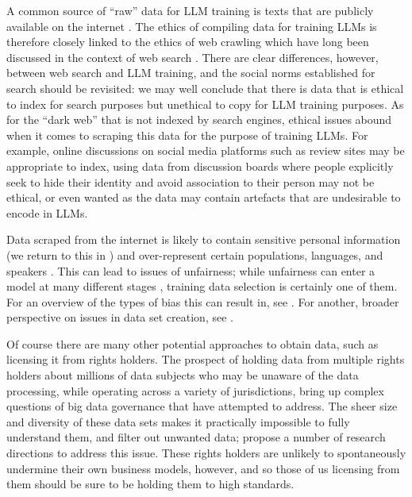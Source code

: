 A common source of ``raw'' data for LLM training is texts that are publicly available on the internet \citep[see e.g.][]{openai2024}. 
The ethics of compiling data for training LLMs is therefore closely linked to the ethics of web crawling which have long been discussed in the context of web search \citep{gold2017robots}. 
There are clear differences, however, between web search and LLM training, and the social norms established for search should be revisited: we may well conclude that there is data that is ethical to index for search purposes but unethical to copy for LLM training purposes.
As for the ``dark web'' that is not indexed by search engines, ethical issues abound when it comes to scraping this data for the purpose of training LLMs. 
For example, online discussions on social media platforms such as review sites may be appropriate to index, using data from discussion boards where people explicitly seek to hide their identity and avoid association to their person may not be ethical, or even wanted as the data may contain artefacts that are undesirable to encode in LLMs.

Data scraped from the internet is likely to contain sensitive personal information \cite{mieskes_quantitative_2017} (we return to this in ) and over-represent certain populations, languages, and speakers \cite{Dunn_Mapping_2020}. This can lead to issues of unfairness; while unfairness can enter a model at many different stages \citep{suresh_framework_2021}, training data selection is certainly one of them. 
For an overview of the types of bias this can result in, see \citet{navigli2023biases}. For another, broader perspective on issues in data set creation, see \citet{paullada_data_2020}.

Of course there are many other potential approaches to obtain data, such as licensing it from rights holders. 
The prospect of holding data from multiple rights holders about millions of data subjects who may be unaware of the data processing, while operating across a variety of jurisdictions, bring up complex questions of big data governance that \citet{jernite_data_2022} have attempted to address. 
The sheer size and diversity of these data sets makes it practically impossible to fully understand them, and filter out unwanted data; \citet{luccioni_whats_2021} propose a number of research directions to address this issue. These rights holders are unlikely to spontaneously undermine their own business models, however, and so those of us licensing from them should be sure to be holding them to high standards.

